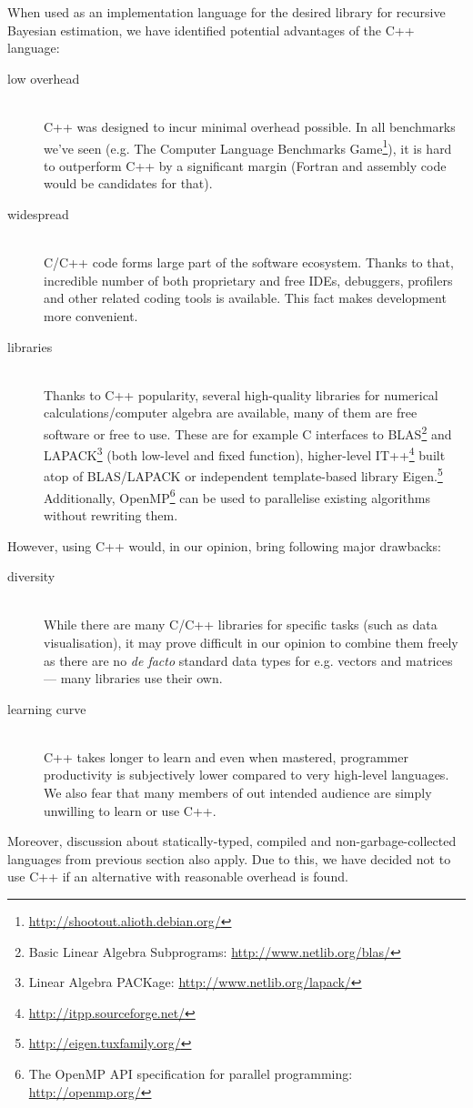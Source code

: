 When used as an implementation language for the desired library for recursive Bayesian estimation, we
have identified potential advantages of the C++ language:
\begin{description}
	\item[low overhead] \hfill \\
		C++ was designed to incur minimal overhead possible. In all benchmarks we've seen (e.g. The
		Computer Language Benchmarks Game\footnote{\url{http://shootout.alioth.debian.org/}}), it is
		hard to outperform C++ by a significant margin (Fortran and assembly code would be
		candidates for that).
	\item[widespread] \hfill \\
		C/C++ code forms large part of the software ecosystem. Thanks to that, incredible number of
		both proprietary and free IDEs, debuggers,
		profilers and other related coding tools is available. This fact makes development more
		convenient.
	\item[libraries] \hfill \\
		Thanks to C++ popularity, several high-quality libraries for numerical calculations/computer
		algebra are available, many of them are free software or free to use. These are for example
		C interfaces to BLAS\footnote{Basic Linear Algebra Subprograms: \url{http://www.netlib.org/blas/}}
		and LAPACK\footnote{Linear Algebra PACKage: \url{http://www.netlib.org/lapack/}} (both low-level
		and fixed function), higher-level IT++\footnote{\url{http://itpp.sourceforge.net/}} built
		atop of BLAS/LAPACK or independent template-based library
		Eigen.\footnote{\url{http://eigen.tuxfamily.org/}} Additionally,
		OpenMP\footnote{The OpenMP API specification for parallel programming: \url{http://openmp.org/}}
		can be used to parallelise existing algorithms without rewriting them.
\end{description}
However, using C++ would, in our opinion, bring following major drawbacks:
\begin{description}
	\item[diversity] \hfill \\
		While there are many C/C++ libraries for specific tasks (such as data visualisation), it
		may prove difficult in our opinion to combine them freely as there are no \emph{de facto}
		standard data types for e.g. vectors and matrices --- many libraries use their own.
	\item[learning curve] \hfill \\
		C++ takes longer to learn and even when mastered, programmer productivity is subjectively
		lower compared to very high-level languages. We also fear that many members of out intended
		audience are simply unwilling to learn or use C++.
\end{description}
Moreover, discussion about statically-typed, compiled and non-garbage-collected languages from
previous section also apply. Due to this, we have decided not to use C++ if an alternative with
reasonable overhead is found.

